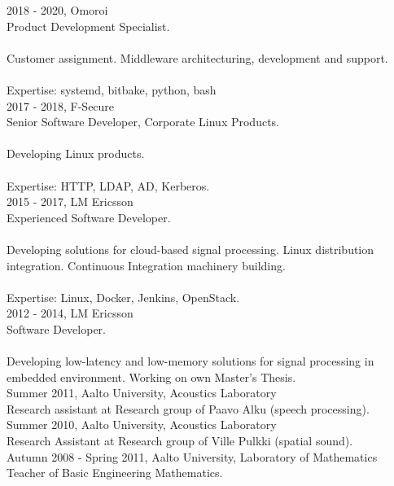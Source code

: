 \documentclass[12pt]{article}
\begin{document}
\large{2018 - 2020, Omoroi}\\
\normalsize{Product Development Specialist.}\\
\\
\normalsize{Customer assignment. Middleware architecturing, development and support.}\\
\\
\normalsize{Expertise: systemd, bitbake, python, bash}\\

\large{2017 - 2018, F-Secure}\\
\normalsize{Senior Software Developer, Corporate Linux Products.}\\
\\
\normalsize{Developing Linux products.}\\
\\
\normalsize{Expertise: HTTP, LDAP, AD, Kerberos.}\\

\large{2015 - 2017, LM Ericsson}\\
\normalsize{Experienced Software Developer.}\\
\\
\normalsize{Developing solutions for cloud-based signal processing. Linux distribution integration. Continuous Integration machinery building.}\\
\\
\normalsize{Expertise: Linux, Docker, Jenkins, OpenStack.}\\

\large{2012 - 2014, LM Ericsson}\\
\normalsize{Software Developer.}\\
\\
\normalsize{Developing low-latency and low-memory solutions for signal processing in embedded environment. Working on own Master's Thesis.}\\

\large{Summer 2011, Aalto University, Acoustics Laboratory}\\
\normalsize{Research assistant at Research group of Paavo Alku (speech
processing).}\\

\large{Summer 2010, Aalto University, Acoustics Laboratory}\\
\normalsize{Research Assistant at Research group of Ville Pulkki (spatial
sound).}\\

\large{Autumn 2008 - Spring 2011, Aalto University, Laboratory of Mathematics}\\
\normalsize{Teacher of Basic Engineering Mathematics.}\\
\end{document}
